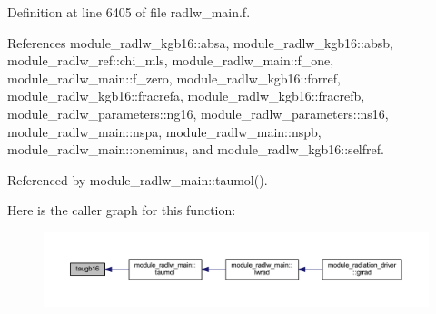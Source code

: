 Definition at line 6405 of file radlw\+\_\+main.\+f.



References module\+\_\+radlw\+\_\+kgb16\+::absa, module\+\_\+radlw\+\_\+kgb16\+::absb, module\+\_\+radlw\+\_\+ref\+::chi\+\_\+mls, module\+\_\+radlw\+\_\+main\+::f\+\_\+one, module\+\_\+radlw\+\_\+main\+::f\+\_\+zero, module\+\_\+radlw\+\_\+kgb16\+::forref, module\+\_\+radlw\+\_\+kgb16\+::fracrefa, module\+\_\+radlw\+\_\+kgb16\+::fracrefb, module\+\_\+radlw\+\_\+parameters\+::ng16, module\+\_\+radlw\+\_\+parameters\+::ns16, module\+\_\+radlw\+\_\+main\+::nspa, module\+\_\+radlw\+\_\+main\+::nspb, module\+\_\+radlw\+\_\+main\+::oneminus, and module\+\_\+radlw\+\_\+kgb16\+::selfref.



Referenced by module\+\_\+radlw\+\_\+main\+::taumol().



Here is the caller graph for this function\+:
\nopagebreak
\begin{figure}[H]
\begin{center}
\leavevmode
\includegraphics[width=350pt]{radlw__main_8f_a942ce0031745cd1b3b4ebc3915970554_icgraph}
\end{center}
\end{figure}


